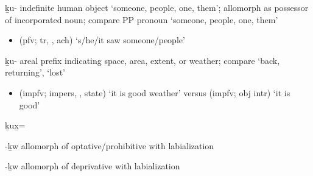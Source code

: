 \begin{morphdesc}[resume*=alphalist]
\item[ḵu-]\label{m:ḵu-indef}
	indefinite human object ‘someone, people, one, them’;
	allomorph  as possessor of incorporated noun;
	compare PP pronoun  ‘someone, people, one, them’
	\begin{itemize}
	\item	{} (pfv; tr, , ach) ‘s/he/it saw someone/people’
	\end{itemize}

\item[ḵu-]\label{m:ḵu-areal}
	areal prefix indicating space, area, extent, or weather;
	compare  ‘back, returning’,  ‘lost’
	\begin{itemize}
	\item	{} (impfv; impers, ,  state) ‘it is good weather’\newline
		versus  (impfv; obj intr) ‘it is good’
	\end{itemize}

\item[ḵux̱=]\label{m:ḵux̱=}

\item[-ḵw]\label{m:-ḵw-optphib}
	allomorph of optative/prohibitive  with labialization

\item[-ḵw]\label{m:-ḵw-dprv}
	allomorph of deprivative  with labialization


\end{morphdesc}
